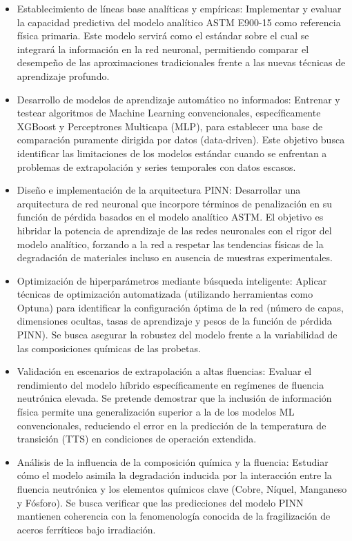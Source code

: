 \documentclass[a4paper, 12pt, twocolumn]{book}
\begin{document}
\begin{itemize}
    \item Establecimiento de líneas base analíticas y empíricas: Implementar y evaluar la capacidad predictiva del modelo analítico ASTM E900-15 como referencia física primaria. Este modelo servirá como el estándar sobre el cual se integrará la información en la red neuronal, permitiendo comparar el desempeño de las aproximaciones tradicionales frente a las nuevas técnicas de aprendizaje profundo.

    \item Desarrollo de modelos de aprendizaje automático no informados: Entrenar y testear algoritmos de Machine Learning convencionales, específicamente XGBoost y Perceptrones Multicapa (MLP), para establecer una base de comparación puramente dirigida por datos (data-driven). Este objetivo busca identificar las limitaciones de los modelos estándar cuando se enfrentan a problemas de extrapolación y series temporales con datos escasos.

    \item Diseño e implementación de la arquitectura PINN: Desarrollar una arquitectura de red neuronal que incorpore términos de penalización en su función de pérdida basados en el modelo analítico ASTM. El objetivo es hibridar la potencia de aprendizaje de las redes neuronales con el rigor del modelo analítico, forzando a la red a respetar las tendencias físicas de la degradación de materiales incluso en ausencia de muestras experimentales.

    \item Optimización de hiperparámetros mediante búsqueda inteligente: Aplicar técnicas de optimización automatizada (utilizando herramientas como Optuna) para identificar la configuración óptima de la red (número de capas, dimensiones ocultas, tasas de aprendizaje y pesos de la función de pérdida PINN). Se busca asegurar la robustez del modelo frente a la variabilidad de las composiciones químicas de las probetas.

    \item Validación en escenarios de extrapolación a altas fluencias: Evaluar el rendimiento del modelo híbrido específicamente en regímenes de fluencia neutrónica elevada. Se pretende demostrar que la inclusión de información física permite una generalización superior a la de los modelos ML convencionales, reduciendo el error en la predicción de la temperatura de transición (TTS) en condiciones de operación extendida.

    \item Análisis de la influencia de la composición química y la fluencia: Estudiar cómo el modelo asimila la degradación inducida por la interacción entre la fluencia neutrónica y los elementos químicos clave (Cobre, Níquel, Manganeso y Fósforo). Se busca verificar que las predicciones del modelo PINN mantienen coherencia con la fenomenología conocida de la fragilización de aceros ferríticos bajo irradiación.
\end{itemize}
\end{document}
